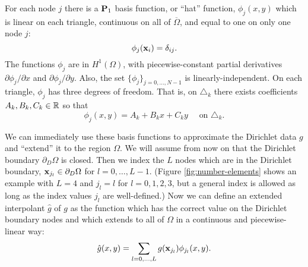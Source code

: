 For each node $j$ there is a $\mathbf{P}_1$ basis function, or ``hat'' function, $\phi_j(x,y)$ which is linear on each triangle, continuous on all of $\overline{\Omega}$, and equal to one on only one node $j$:%
\begin{equation*}
\phi_j(\mathbf{x}_i) = \delta_{ij}.
\end{equation*}
The functions $\phi_j$ are in $H^1(\Omega)$, with piecewise-constant partial derivatives $\partial\phi_j/\partial x$ and $\partial\phi_j/\partial y$.  Also, the set $\{\phi_j\}_{j=0,\dots,N-1}$ is linearly-independent.  On each triangle, $\phi_j$ has three degrees of freedom.  That is, on $\triangle_k$ there exists coefficients $A_k,B_k,C_k\in\mathbb{R}$ so that
\begin{equation*}
\phi_j(x,y) = A_k + B_k x + C_k y \quad \text{ on } \triangle_k.
\end{equation*}

We can immediately use these basis functions to approximate the Dirichlet data $g$ and ``extend'' it to the region $\Omega$.  We will assume from now on that the Dirichlet boundary $\partial_D\Omega$ is closed.  Then we index the $L$ nodes which are in the Dirichlet boundary, $\mathbf{x}_{j_l} \in \partial_D\Omega$ for $l=0,\dots,L-1$.  (Figure \ref{fig:number-elements} shows an example with $L=4$ and $j_l=l$ for $l=0,1,2,3$, but a general index is allowed as long as the index values $j_l$ are well-defined.)  Now we can define an extended interpolant $\hat g$ of $g$ as the function which has the correct value on the Dirichlet boundary nodes and which extends to all of $\Omega$ in a continuous and piecewise-linear way:
\begin{equation}
\hat g(x,y) = \sum_{l=0,\dots,L} g(\mathbf{x}_{j_l}) \phi_{j_l}(x,y). \label{hatgdefine}
\end{equation}

